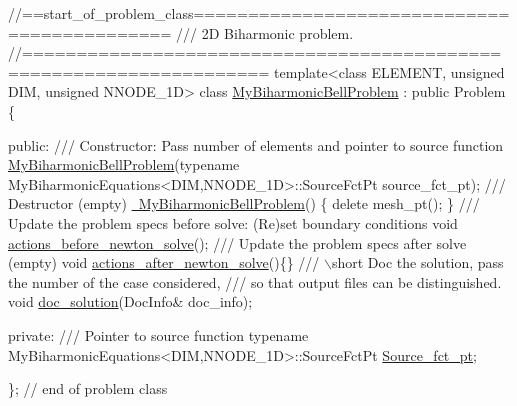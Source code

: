  
\begin{DoxyCodeInclude}
\textcolor{comment}{//==start\_of\_problem\_class============================================}
\textcolor{comment}{/// 2D Biharmonic problem.}
\textcolor{comment}{}\textcolor{comment}{//====================================================================}
\textcolor{keyword}{template}<\textcolor{keyword}{class} ELEMENT, \textcolor{keywordtype}{unsigned} DIM, \textcolor{keywordtype}{unsigned} NNODE\_1D> 
\textcolor{keyword}{class }\hyperlink{classMyBiharmonicBellProblem}{MyBiharmonicBellProblem} : \textcolor{keyword}{public} Problem
\{

\textcolor{keyword}{public}:
\textcolor{comment}{}
\textcolor{comment}{ /// Constructor: Pass number of elements and pointer to source function}
\textcolor{comment}{} \hyperlink{classMyBiharmonicBellProblem_a61b5ab7db1511188dd7ca00e01179dda}{MyBiharmonicBellProblem}(\textcolor{keyword}{typename} MyBiharmonicEquations<DIM,NNODE\_1D>::SourceFctPt 
      source\_fct\_pt);
\textcolor{comment}{}
\textcolor{comment}{ /// Destructor (empty)}
\textcolor{comment}{} \hyperlink{classMyBiharmonicBellProblem_aa81548287a36375d4e3841cf3d71489b}{~MyBiharmonicBellProblem}()
  \{
   \textcolor{keyword}{delete} mesh\_pt();
  \}
\textcolor{comment}{}
\textcolor{comment}{ /// Update the problem specs before solve: (Re)set boundary conditions}
\textcolor{comment}{} \textcolor{keywordtype}{void} \hyperlink{classMyBiharmonicBellProblem_acdbf06c4f8cf70ee89cd8f1002da98e8}{actions\_before\_newton\_solve}();
\textcolor{comment}{}
\textcolor{comment}{ /// Update the problem specs after solve (empty)}
\textcolor{comment}{} \textcolor{keywordtype}{void} \hyperlink{classMyBiharmonicBellProblem_afbe1effa8e47ff655f99d8ec869eaa2f}{actions\_after\_newton\_solve}()\{\}
\textcolor{comment}{}
\textcolor{comment}{ /// \(\backslash\)short Doc the solution, pass the number of the case considered,}
\textcolor{comment}{ /// so that output files can be distinguished.}
\textcolor{comment}{} \textcolor{keywordtype}{void} \hyperlink{classMyBiharmonicBellProblem_ae361099fb498e9965ea37a648ce71032}{doc\_solution}(DocInfo& doc\_info);
 
\textcolor{keyword}{private}:
\textcolor{comment}{}
\textcolor{comment}{ /// Pointer to source function}
\textcolor{comment}{} \textcolor{keyword}{typename} MyBiharmonicEquations<DIM,NNODE\_1D>::SourceFctPt \hyperlink{classMyBiharmonicBellProblem_ac67539e5f625b52f2da8055599e2c72d}{Source\_fct\_pt};
 
\}; \textcolor{comment}{// end of problem class}

\end{DoxyCodeInclude}





